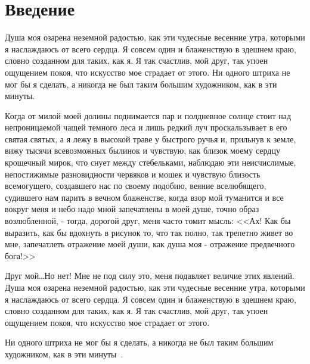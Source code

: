 \chapter{Введение}

Душа моя озарена неземной радостью, как эти чудесные весенние утра, которыми я
наслаждаюсь от всего сердца. Я совсем один и блаженствую в здешнем краю,
словно созданном для таких, как я. Я так счастлив, мой друг, так упоен
ощущением покоя, что искусство мое страдает от этого. Ни одного штриха не мог
бы я сделать, а никогда не был таким большим художником, как в эти минуты.

Когда от милой моей долины поднимается пар и полдневное солнце стоит над
непроницаемой чащей темного леса и лишь редкий луч проскальзывает в его святая
святых, а я лежу в высокой траве у быстрого ручья и, прильнув к земле, вижу
тысячи всевозможных былинок и чувствую, как близок моему сердцу крошечный
мирок, что снует между стебельками, наблюдаю эти неисчислимые, непостижимые
разновидности червяков и мошек и чувствую близость всемогущего, создавшего нас
по своему подобию, веяние вселюбящего, судившего нам парить в вечном
блаженстве, когда взор мой туманится и все вокруг меня и небо надо мной
запечатлены в моей душе, точно образ возлюбленной, - тогда, дорогой друг, меня
часто томит мысль: <<Ах! Как бы выразить, как бы вдохнуть в рисунок то, что
так полно, так трепетно живет во мне, запечатлеть отражение моей души, как
душа моя - отражение предвечного бога!>>

Друг мой\dots Но нет! Мне не под силу это, меня подавляет величие этих
явлений. Душа моя озарена неземной радостью, как эти чудесные весенние утра,
которыми я наслаждаюсь от всего сердца. Я совсем один и блаженствую в здешнем
краю, словно созданном для таких, как я. Я так счастлив, мой друг, так упоен
ощущением покоя, что искусство мое страдает от этого.

Ни одного штриха не мог бы я сделать, а никогда не был таким большим
художником, как в эти минуты~\cite{podbelsky2015kurs}.
